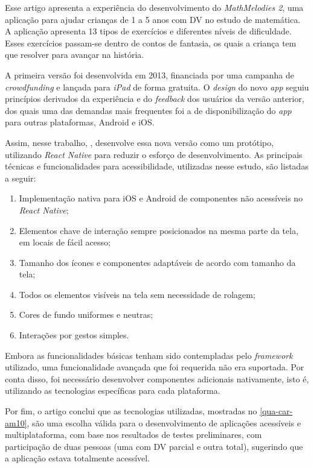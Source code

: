 Esse artigo apresenta a experiência do desenvolvimento do \emph{MathMelodies 2}, uma aplicação para ajudar crianças de 1 a 5 anos com DV no estudo de matemática.
A aplicação apresenta 13 tipos de exercícios e diferentes níveis de dificuldade.
Esses exercícios passam-se dentro de contos de fantasia, os quais a criança tem que resolver para avançar na história.

A primeira versão foi desenvolvida em 2013, financiada por uma campanha de \emph{crowdfunding} e lançada para \emph{iPad} de forma gratuita.
O \emph{design} do novo \emph{app} seguiu princípios derivados da experiência e do \emph{feedback} dos usuários da versão anterior, dos quais
uma das demandas mais frequentes foi a de disponibilização do \emph{app} para outras plataformas, Android e iOS\@.

Assim, nesse trabalho, , desenvolve essa nova versão como um protótipo, utilizando \emph{React Native} para reduzir o esforço de desenvolvimento.
As principais técnicas e funcionalidades para acessibilidade, utilizadas nesse estudo, são listadas a seguir:

\begin{enumerate}
  \item Implementação nativa para iOS e Android de componentes não acessíveis no \emph{React Native};
  \item Elementos chave de interação sempre posicionados na mesma parte da tela, em locais de fácil acesso;
  \item Tamanho dos ícones e componentes adaptáveis de acordo com tamanho da tela;
  \item Todos os elementos visíveis na tela sem necessidade de rolagem;
  \item Cores de fundo uniformes e neutras;
  \item Interações por gestos simples.
\end{enumerate}

Embora as funcionalidades básicas tenham sido contempladas pelo \emph{framework} utilizado, uma funcionalidade avançada que foi requerida não era suportada.
Por conta disso, foi necessário desenvolver componentes adicionais nativamente, isto é, utilizando as tecnologias específicas para cada plataforma.

Por fim, o artigo conclui que as tecnologias utilizadas, mostradas no \autoref{qua-car-am10}, são uma escolha válida para o desenvolvimento
de aplicações acessíveis e multiplataforma, com base nos resultados de testes preliminares, com participação de duas pessoas (uma com DV
parcial e outra total), sugerindo que a aplicação estava totalmente acessível.

